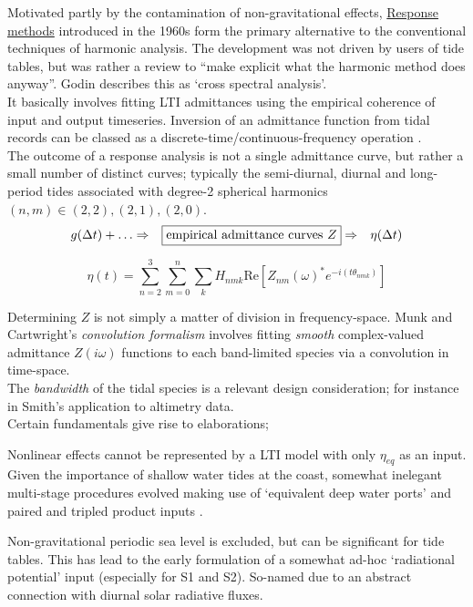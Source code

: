Motivated partly by the contamination of non-gravitational effects, \underline{Response methods} \citep{Munk:1966ts} introduced in the 1960s form the primary alternative to the conventional techniques of harmonic analysis. The development was not driven by users of tide tables, but was rather a review to ``make explicit what the harmonic method does anyway''\citep[pp 540]{Munk:1966ts}.
Godin \citep{Godin:1991vx} describes this as `cross spectral analysis'.\\
It basically involves fitting LTI admittances using the empirical coherence of input and output timeseries. Inversion of an admittance function from tidal records can be classed as a discrete-time/continuous-frequency operation \citep{Percival:1998tw}.\\

The outcome of a response analysis is not a single admittance curve, but rather a small number of distinct curves; typically the semi-diurnal, diurnal and long-period tides associated with degree-2 spherical harmonics $(n,m) \in (2,2),(2,1),(2,0)$.\\

\begin{align}
\label{E:response}
g(\Delta t) + \dots &\Rightarrow & \fbox{empirical admittance curves $Z$} &\Rightarrow & \mbox{$\eta(\Delta t)$}  %
\end{align}


\begin{equation}
\label{E:Z}
\eta(t) = \sum_{n=2}^{3}\sum_{m=0}^{n}\sum_{k} H_{nmk} \text{Re} \left[ Z_{nm}(\omega)^*e^{-i(t\theta_{nmk})} \right] 
\end{equation}


Determining $Z$ is not simply a matter of division in frequency-space.  Munk and Cartwright's \emph{convolution formalism} involves fitting \emph{smooth} complex-valued admittance $Z(i\omega)$ functions to each band-limited species via a convolution in time-space.\\
The \emph{bandwidth} of the tidal species is a relevant design consideration; for instance in Smith's \citep{Smith:1997ut} application to altimetry data.\\

Certain fundamentals give rise to elaborations;
\begin{compactitem}
\item Nonlinear effects cannot be represented by a LTI model with only $\eta_{eq}$ as an input.  Given the importance of shallow water tides at the coast, somewhat inelegant multi-stage procedures evolved making use of `equivalent deep water ports' and paired and tripled product inputs \citep[pp 122]{Pugh:1996uz}.\\
\item Non-gravitational periodic sea level is excluded, but can be significant for tide tables.   This has lead to the early formulation of a somewhat ad-hoc `radiational potential' input (especially for S1 and S2). So-named due to an abstract connection with diurnal solar radiative fluxes.\\
\end{compactitem}

